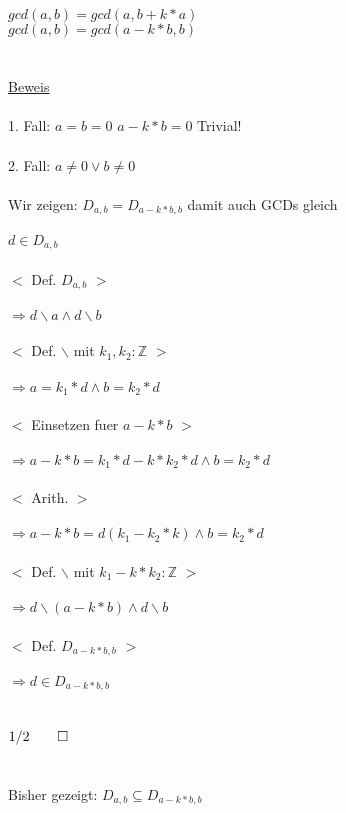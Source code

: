 \documentclass[18pt,a4paper]{article}
\newcommand{\tab}{\hspace*{2em}}
\begin{document}
$gcd(a,b) = gcd(a,b + k*a)$\\
$gcd(a,b) = gcd(a-k*b,b)$\\
\\
\\
\uline{Beweis}\\
\\
1. Fall: $a=b=0$ \tab $a-k*b =0$  Trivial!\\
\\
2. Fall: $a\neq 0 \vee b\neq 0$\\
\\
Wir zeigen: $D_{a,b} = D_{a-k*b,b}$ damit auch GCDs gleich\\
\\
$d\in D_{a,b}$\\
\\
\tab $<$ Def. $D_{a,b}$ $>$\\
\\
$\Rightarrow d\backslash a \wedge d\backslash b$\\
\\
\tab $<$ Def. $\backslash$ mit $k_1,k_2 : \mathbb{Z}$ $>$\\
\\
$\Rightarrow a = k_1*d \wedge b = k_2*d$\\
\\
\tab $<$ Einsetzen fuer $a-k*b$ $>$\\
\\
$\Rightarrow a-k*b = k_1 *d - k*k_2*d \wedge b = k_2 *d$\\
\\
\tab $<$ Arith. $>$\\
\\
$\Rightarrow a -k*b = d(k_1 - k_2*k) \wedge b = k_2 *d$\\
\\
\tab $<$ Def. $\backslash$ mit $k_1 - k*k_2: \mathbb{Z}$ $>$\\
\\
$\Rightarrow d \backslash (a-k*b) \wedge d\backslash b$\\
\\
\tab $<$ Def. $D_{a-k*b,b}$ $>$\\
\\
$\Rightarrow d \in D_{a-k*b,b}$\\
\\
\\
$1/2 \qed$\\
\\
\\
Bisher gezeigt: $D_{a,b} \subseteq D_{a-k*b,b}$\\
\end{document}
